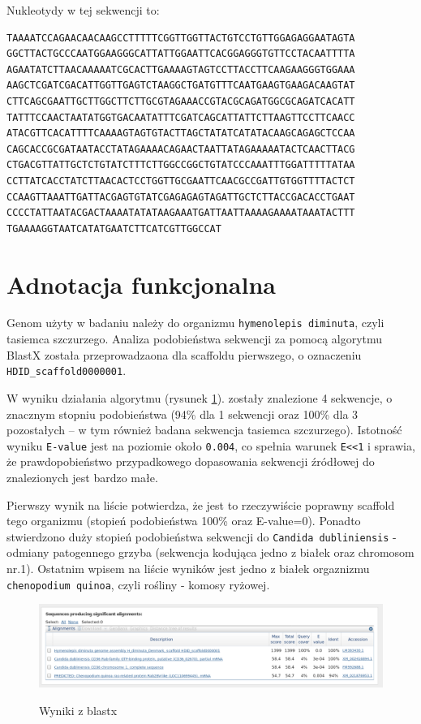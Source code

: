 \documentclass[a4paper]{article}
\begin{document}
Nukleotydy w tej sekwencji to:

\begin{verbatim}
TAAAATCCAGAACAACAAGCCTTTTTCGGTTGGTTACTGTCCTGTTGGAGAGGAATAGTA
GGCTTACTGCCCAATGGAAGGGCATTATTGGAATTCACGGAGGGTGTTCCTACAATTTTA
AGAATATCTTAACAAAAATCGCACTTGAAAAGTAGTCCTTACCTTCAAGAAGGGTGGAAA
AAGCTCGATCGACATTGGTTGAGTCTAAGGCTGATGTTTCAATGAAGTGAAGACAAGTAT
CTTCAGCGAATTGCTTGGCTTCTTGCGTAGAAACCGTACGCAGATGGCGCAGATCACATT
TATTTCCAACTAATATGGTGACAATATTTCGATCAGCATTATTCTTAAGTTCCTTCAACC
ATACGTTCACATTTTCAAAAGTAGTGTACTTAGCTATATCATATACAAGCAGAGCTCCAA
CAGCACCGCGATAATACCTATAGAAAACAGAACTAATTATAGAAAAATACTCAACTTACG
CTGACGTTATTGCTCTGTATCTTTCTTGGCCGGCTGTATCCCAAATTTGGATTTTTATAA
CCTTATCACCTATCTTAACACTCCTGGTTGCGAATTCAACGCCGATTGTGGTTTTACTCT
CCAAGTTAAATTGATTACGAGTGTATCGAGAGAGTAGATTGCTCTTACCGACACCTGAAT
CCCCTATTAATACGACTAAAATATATAAGAAATGATTAATTAAAAGAAAATAAATACTTT
TGAAAAGGTAATCATATGAATCTTCATCGTTGGCCAT
\end{verbatim}


\section{Adnotacja funkcjonalna}
Genom użyty w badaniu należy do organizmu \texttt{hymenolepis diminuta}, czyli tasiemca szczurzego. Analiza podobieństwa sekwencji za pomocą 
algorytmu BlastX została przeprowadzaona dla scaffoldu pierwszego, o oznaczeniu \texttt{HDID\_scaffold0000001}.

W wyniku działania algorytmu (rysunek \ref{fig:result}). zostały znalezione 4 sekwencje, o znacznym stopniu podobieństwa
(94\% dla 1 sekwencji oraz 100\% dla 3 pozostałych -- w tym również badana sekwencja tasiemca szczurzego).
Istotność wyniku \texttt{E-value} jest na poziomie około \texttt{0.004},
co spełnia warunek \texttt{E<<1} i sprawia, że prawdopobieństwo przypadkowego dopasowania
sekwencji źródłowej do znalezionych jest bardzo małe.

Pierwszy wynik na liście potwierdza, że jest to rzeczywiście poprawny scaffold tego organizmu
(stopień podobieństwa 100\% oraz E-value=0). Ponadto stwierdzono duży stopień podobieństwa sekwencji do \texttt{Candida dubliniensis} - odmiany
patogennego grzyba (sekwencja kodująca jedno z białek oraz chromosom nr.1). Ostatnim wpisem na liście wyników jest jedno z białek orgaznizmu
\texttt{chenopodium quinoa}, czyli rośliny - komosy ryżowej. 

\begin{figure}[h]
    \centering
    \includegraphics[width=1.0\textwidth]{result.png}
    \label{fig:result}
    \caption[]{Wyniki z blastx}
\end{figure}
\end{document}
